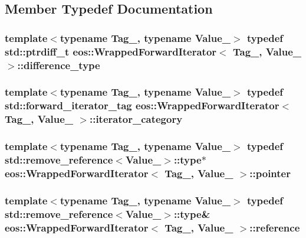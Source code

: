 \subsection{Member Typedef Documentation}
\hypertarget{classeos_1_1WrappedForwardIterator_af3705260b81ff899661f7f77f25c72e2}{
\subsubsection[{difference\_\-type}]{\setlength{\rightskip}{0pt plus 5cm}template$<$typename Tag\_\-, typename Value\_\-$>$ typedef std::ptrdiff\_\-t {\bf eos::WrappedForwardIterator}$<$ Tag\_\-, Value\_\- $>$::{\bf difference\_\-type}}}
\label{classeos_1_1WrappedForwardIterator_af3705260b81ff899661f7f77f25c72e2}
\hypertarget{classeos_1_1WrappedForwardIterator_ade461e57f6b6527039eecb200bf53c85}{
\subsubsection[{iterator\_\-category}]{\setlength{\rightskip}{0pt plus 5cm}template$<$typename Tag\_\-, typename Value\_\-$>$ typedef std::forward\_\-iterator\_\-tag {\bf eos::WrappedForwardIterator}$<$ Tag\_\-, Value\_\- $>$::{\bf iterator\_\-category}}}
\label{classeos_1_1WrappedForwardIterator_ade461e57f6b6527039eecb200bf53c85}
\hypertarget{classeos_1_1WrappedForwardIterator_addb7c63e8b8d4be0a65ded32a4cb7cb9}{
\subsubsection[{pointer}]{\setlength{\rightskip}{0pt plus 5cm}template$<$typename Tag\_\-, typename Value\_\-$>$ typedef std::remove\_\-reference$<$Value\_\-$>$::type$\ast$ {\bf eos::WrappedForwardIterator}$<$ Tag\_\-, Value\_\- $>$::{\bf pointer}}}
\label{classeos_1_1WrappedForwardIterator_addb7c63e8b8d4be0a65ded32a4cb7cb9}
\hypertarget{classeos_1_1WrappedForwardIterator_ac7ba4ace12142ac73d97df5d555a4c18}{
\subsubsection[{reference}]{\setlength{\rightskip}{0pt plus 5cm}template$<$typename Tag\_\-, typename Value\_\-$>$ typedef std::remove\_\-reference$<$Value\_\-$>$::type\& {\bf eos::WrappedForwardIterator}$<$ Tag\_\-, Value\_\- $>$::{\bf reference}}}
